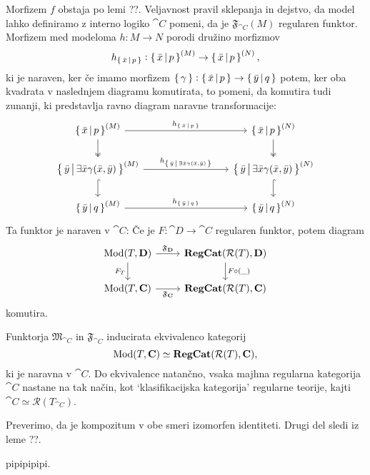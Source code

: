 \documentclass[../kategoricna_logika.tex]{subfiles}
\begin{document}
Morfizem $f$ obstaja po lemi ??. Veljavnost pravil sklepanja in dejstvo, da model lahko definiramo z interno logiko $\cat{C}$ pomeni, da je $\mathfrak{F}_{\cat{C}}(M)$ regularen funktor.
Morfizem med modeloma $h : M \to N$ porodi družino morfizmov 
$$h_{\left\lbrace\,\bar{x}\,\middle|\, p\,\right\rbrace} : \left\lbrace\,\bar{x}\,\middle|\, p\,\right\rbrace^{(M)} \to \left\lbrace\,\bar{x}\,\middle|\, p\,\right\rbrace^{(N)},$$
ki je naraven, ker če imamo morfizem $\left\lbrace\,\gamma\,\right\rbrace : \left\lbrace\,\bar{x}\,\middle|\, p\,\right\rbrace \to \left\lbrace\,\bar{y}\,\middle|\, q\,\right\rbrace$ potem, ker oba kvadrata v naslednjem diagramu komutirata, to pomeni, da komutira tudi zunanji, ki predstavlja ravno diagram naravne transformacije:
\begin{equation*}
  \begin{tikzcd}[column sep=3cm]
    \set{\bar{x}\,\middle|\, p}^{(M)} \ar[d, two heads] \ar[r, "h_{\set{\bar{x}\,\middle|\, p}}"] & \set{\bar{x}\,\middle|\, p}^{(N)} \ar[d, two heads] \\
    \set{\bar{y}\,\middle|\, \exists \bar{x} \gamma(\bar{x}, \bar{y})}^{(M)}  \ar[d, hook] \ar[r, "h_{\set{\bar{y}\,\middle|\, \exists \bar{x} \gamma(\bar{x}, \bar{y})}}"] & \set{\bar{y}\,\middle|\, \exists \bar{x} \gamma(\bar{x}, \bar{y})}^{(N)} \ar[d, hook] \\
    \set{\bar{y}\,\middle|\, q}^{(M)} \ar[r, "h_{\set{\bar{y}\,\middle|\, q}}"] & \set{\bar{y}\,\middle|\, q}^{(N)}
  \end{tikzcd}
\end{equation*}
Ta funktor je naraven v $\cat{C}$: Če je $F : \cat{D} \to \cat{C}$ regularen funktor, potem diagram
\begin{equation}
  \begin{tikzcd}
    \Mod(T, \cat{D}) \ar[d, "F_T"'] \ar[r, "\mathfrak{F}_{\cat{D}}"] & \cat{RegCat}(\mathcal{R}(T), \cat{D}) \ar[d, "F \circ (\_)"] \\
    \Mod(T, \cat{C}) \ar[r, "\mathfrak{F}_{\cat{C}}"'] & \cat{RegCat}(\mathcal{R}(T), \cat{C})
  \end{tikzcd}
\end{equation}
komutira.
\begin{izrek}
  Funktorja $\mathfrak{M}_{\cat{C}}$ in $\mathfrak{F}_{\cat{C}}$ inducirata ekvivalenco kategorij
  $$\operatorname{Mod}(T, {\operatorname{\mathbf{C}}}) \simeq {\operatorname{\mathbf{RegCat}}}(\mathcal{R}(T), {\operatorname{\mathbf{C}}}),$$
  ki je naravna v $\cat{C}$. Do ekvivalence natančno, vsaka majhna regularna kategorija $\cat{C}$ nastane na tak način, kot `klasifikacijska kategorija' regularne teorije, kajti $\cat{C} \simeq \mathcal{R}(T_{\cat{C}})$.
\end{izrek}
\begin{dokaz}
  Preverimo, da je kompozitum v obe smeri izomorfen identiteti. Drugi del sledi iz leme ??.
\end{dokaz}
pipipipipi.
\end{document}
